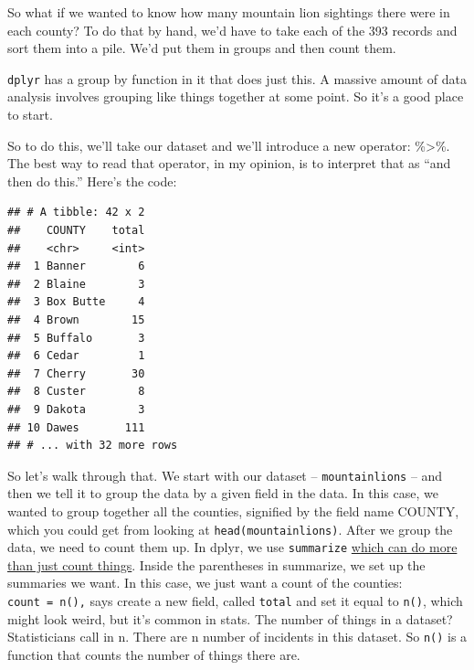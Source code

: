 \documentclass[]{book}
\newenvironment{Shaded}{\begin{snugshade}}{\end{snugshade}}
\newcommand{\DataTypeTok}[1]{\textcolor[rgb]{0.13,0.29,0.53}{#1}}
\newcommand{\KeywordTok}[1]{\textcolor[rgb]{0.13,0.29,0.53}{\textbf{#1}}}
\newcommand{\NormalTok}[1]{#1}
\newcommand{\OperatorTok}[1]{\textcolor[rgb]{0.81,0.36,0.00}{\textbf{#1}}}
\newcommand{\StringTok}[1]{\textcolor[rgb]{0.31,0.60,0.02}{#1}}
\begin{document}
So what if we wanted to know how many mountain lion sightings there were in each county? To do that by hand, we'd have to take each of the 393 records and sort them into a pile. We'd put them in groups and then count them.

\texttt{dplyr} has a group by function in it that does just this. A massive amount of data analysis involves grouping like things together at some point. So it's a good place to start.

So to do this, we'll take our dataset and we'll introduce a new operator: \%\textgreater{}\%. The best way to read that operator, in my opinion, is to interpret that as ``and then do this.'' Here's the code:

\begin{Shaded}
\end{Shaded}

\begin{verbatim}
## # A tibble: 42 x 2
##    COUNTY    total
##    <chr>     <int>
##  1 Banner        6
##  2 Blaine        3
##  3 Box Butte     4
##  4 Brown        15
##  5 Buffalo       3
##  6 Cedar         1
##  7 Cherry       30
##  8 Custer        8
##  9 Dakota        3
## 10 Dawes       111
## # ... with 32 more rows
\end{verbatim}

So let's walk through that. We start with our dataset -- \texttt{mountainlions} -- and then we tell it to group the data by a given field in the data. In this case, we wanted to group together all the counties, signified by the field name COUNTY, which you could get from looking at \texttt{head(mountainlions)}. After we group the data, we need to count them up. In dplyr, we use \texttt{summarize} \href{http://dplyr.tidyverse.org/reference/summarise.html}{which can do more than just count things}. Inside the parentheses in summarize, we set up the summaries we want. In this case, we just want a count of the counties: \texttt{count\ =\ n(),} says create a new field, called \texttt{total} and set it equal to \texttt{n()}, which might look weird, but it's common in stats. The number of things in a dataset? Statisticians call in n. There are n number of incidents in this dataset. So \texttt{n()} is a function that counts the number of things there are.
\end{document}
